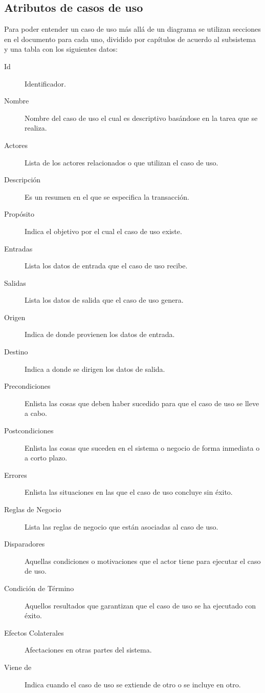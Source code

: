\subsection{Atributos de casos de uso}

Para poder entender un caso de uso más allá de un diagrama se utilizan secciones en el documento para cada uno, dividido por capítulos de acuerdo al subsistema y una tabla con los siguientes datos:

\begin{description}
	\item[Id] Identificador.
	\item[Nombre] Nombre del caso de uso el cual es descriptivo basándose en la tarea que se realiza.
	\item[Actores] Lista de los actores relacionados o que utilizan el caso de uso.
	\item[Descripción] Es un resumen en el que se especifica la transacción.
	\item[Propósito] Indica el objetivo por el cual el caso de uso existe.
	\item[Entradas] Lista los datos de entrada que el caso de uso recibe.
	\item[Salidas] Lista los datos de salida que el caso de uso genera.
	\item[Origen] Indica de donde provienen los datos de entrada.
	\item[Destino] Indica a donde se dirigen los datos de salida.
	\item[Precondiciones] Enlista las cosas que deben haber sucedido para que el caso  de uso se lleve a cabo.
	\item[Postcondiciones] Enlista las cosas que suceden en el sistema o negocio de forma inmediata o a corto plazo.
	\item[Errores] Enlista las situaciones en las que el caso de uso concluye sin éxito.
	\item[Reglas de Negocio] Lista las reglas de negocio que están asociadas al caso de uso.
	\item[Disparadores] Aquellas condiciones o motivaciones que el actor tiene para ejecutar el caso de uso.
	\item[Condición de Término] Aquellos resultados que garantizan que el caso de uso se ha ejecutado con éxito.
	\item[Efectos Colaterales] Afectaciones en otras partes del sistema.
	\item[Viene de] Indica cuando el caso de uso se extiende de otro o se incluye en otro.
\end{description}

